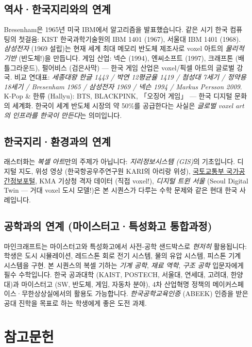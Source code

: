 \documentclass[12pt,a4paper]{scrartcl}
\begin{document}
\subsection{역사·한국지리와의 연계}
Bresenham은 1965년 미국 IBM에서 알고리즘을 발표했습니다. 같은 시기 한국 컴퓨팅의 첫걸음: KIST 한국과학기술원의 IBM 1401 (1967), 서울대 IBM 1401 (1968). \emph{삼성전자} (1969 설립)는 현재 세계 최대 메모리 반도체 제조사로 voxel 아트의 \emph{물리적 기반} (반도체!)을 만듭니다. 게임 산업: 넥슨 (1994), 엔씨소프트 (1997), 크래프톤 (배틀그라운드), 펄어비스 (검은사막) --- 한국 게임 산업은 voxel/픽셀 아트의 글로벌 강국. 비교 연대표: \emph{세종대왕 한글 1443 / 박연 12평균율 1419 / 첨성대 7세기 / 정약용 18세기 / Bresenham 1965 / 삼성전자 1969 / 넥슨 1994 / Markus Persson 2009}. K-Pop & 한류 (Hallyu): BTS, BLACKPINK, 「오징어 게임」 --- 한국 디지털 문화의 세계화. 한국이 세계 반도체 시장의 약 50\%를 공급한다는 사실은 \emph{글로벌 voxel art의 인프라를 한국이 만든다}는 의미입니다.

\subsection{한국지리·환경과의 연계}
래스터화는 \emph{복셀 아트}만의 주제가 아닙니다: \emph{지리정보시스템 (GIS)}의 기초입니다. 디지털 지도, 위성 영상 (한국항공우주연구원 KARI의 아리랑 위성), \href{http://www.nsdi.go.kr/}{국토교통부 국가공간정보포털}, KMA 기상청 격자 데이터 (직접 voxel!), \emph{디지털 트윈 서울} (Seoul Digital Twin --- 거대 voxel 도시 모델!)은 본 시퀀스가 다루는 수학 문제와 같은 현대 한국 사례입니다.

\subsection{공학과의 연계 (마이스터고·특성화고 통합과정)}
마인크래프트는 마이스터고와 특성화고에서 사전-공학 샌드박스로 \emph{현저히} 활용됩니다: 학생은 도시 시뮬레이션, 레드스톤 회로 전기 시스템, 물의 유압 시스템, 피스톤 기계 시스템을 구현. 본 시퀀스의 복셀 기하는 \emph{기계 공학}, \emph{재료 역학}, \emph{구조 공학} 입문자에게 필수 수학입니다. 한국 공과대학 (KAIST, POSTECH, 서울대, 연세대, 고려대, 한양대)과 마이스터고 (SW, 반도체, 게임, 자동차 분야), 4차 산업혁명 정책의 메이커스페이스·무한상상실에서의 활용도 가능합니다. \emph{한국공학교육인증} (ABEEK) 인증을 받은 공대 진학을 목표로 하는 학생에게 좋은 도전 과제.

\section{참고문헌}\label{sec:referencias}
\end{document}
